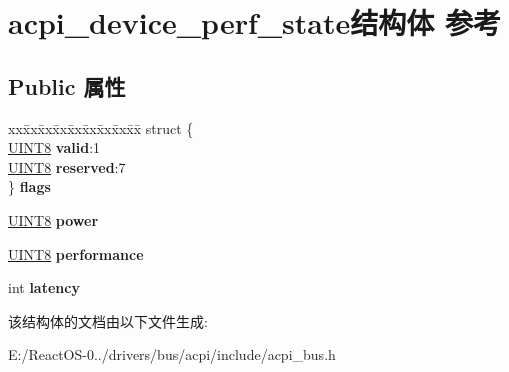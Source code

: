 \hypertarget{structacpi__device__perf__state}{}\section{acpi\+\_\+device\+\_\+perf\+\_\+state结构体 参考}
\label{structacpi__device__perf__state}
\subsection*{Public 属性}
\begin{DoxyCompactItemize}
\item 
\mbox{\label{structacpi__device__perf__state_a903390a3ed53355c88dd5c08475a2b0d}} 
\begin{tabbing}
xx\=xx\=xx\=xx\=xx\=xx\=xx\=xx\=xx\=\kill
struct \{\\
\>\hyperlink{_processor_bind_8h_ab27e9918b538ce9d8ca692479b375b6a}{UINT8} {\bfseries valid}:1\\
\>\hyperlink{_processor_bind_8h_ab27e9918b538ce9d8ca692479b375b6a}{UINT8} {\bfseries reserved}:7\\
\} {\bfseries flags}\\

\end{tabbing}\item 
\mbox{\label{structacpi__device__perf__state_a87b63679ff649ac702ea405fadf57437}} 
\hyperlink{_processor_bind_8h_ab27e9918b538ce9d8ca692479b375b6a}{U\+I\+N\+T8} {\bfseries power}
\item 
\mbox{\label{structacpi__device__perf__state_a7c0e4ac2e2f5c572ac73db32d2b98c2d}} 
\hyperlink{_processor_bind_8h_ab27e9918b538ce9d8ca692479b375b6a}{U\+I\+N\+T8} {\bfseries performance}
\item 
\mbox{\label{structacpi__device__perf__state_aaa24e7315d7e96287ce06e0eaf065e66}} 
int {\bfseries latency}
\end{DoxyCompactItemize}


该结构体的文档由以下文件生成\+:\begin{DoxyCompactItemize}
\item 
E\+:/\+React\+O\+S-\/0../drivers/bus/acpi/include/acpi\+\_\+bus.\+h\end{DoxyCompactItemize}
